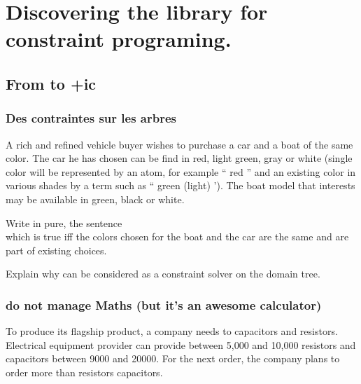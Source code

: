 

\chapter{Discovering the library for constraint programing.}




\section{From \prolog{} to \prolog{}+ic}

\subsection{Des contraintes sur les arbres}

A rich and refined vehicle buyer wishes to purchase a car and a boat of the same color.
The car he has chosen can be find in red, light green, gray or white (single color will be represented by an atom, for example `` red '' and an existing color in various shades by a term such as `` green (light) ').
The boat model that interests may be available in green, black or white.

\begin{question}
 Write in \prolog{} pure, the sentence \\ which is true iff the colors chosen for the boat and the car are the same and are part of existing choices.
\end{question}

\begin{question}\label{QC1}
Explain why \prolog{} can be considered as a constraint solver on the domain tree.
\end{question}

\subsection{\prolog{} do not manage Maths (but it's an awesome calculator)}
To produce its flagship product, a company needs to capacitors and resistors. Electrical equipment provider can provide between 5,000 and 10,000 resistors and capacitors between 9000 and 20000.
For the next order, the company plans to order more than resistors capacitors.

